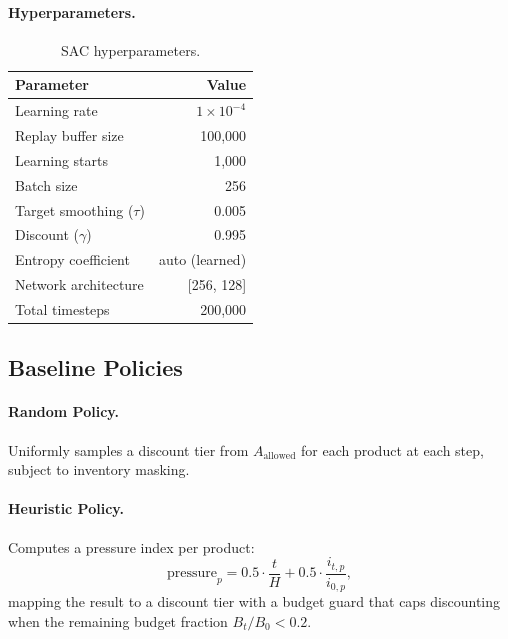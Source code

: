 \documentclass[11pt,a4paper]{article}
\begin{document}
\paragraph{Hyperparameters.}
\begin{table}[H]
\centering
\caption{SAC hyperparameters.}
\begin{tabular}{@{}lr@{}}
\toprule
\textbf{Parameter} & \textbf{Value} \\
\midrule
Learning rate & $1 \times 10^{-4}$ \\
Replay buffer size & 100,000 \\
Learning starts & 1,000 \\
Batch size & 256 \\
Target smoothing ($\tau$) & 0.005 \\
Discount ($\gamma$) & 0.995 \\
Entropy coefficient & auto (learned) \\
Network architecture & [256, 128] \\
Total timesteps & 200,000 \\
\bottomrule
\end{tabular}
\end{table}

\subsection{Baseline Policies}

\paragraph{Random Policy.} Uniformly samples a discount tier from $A_{\text{allowed}}$ for each product at each step, subject to inventory masking.

\paragraph{Heuristic Policy.} Computes a pressure index per product:
\begin{equation}
\text{pressure}_p = 0.5 \cdot \frac{t}{H} + 0.5 \cdot \frac{i_{t,p}}{i_{0,p}},
\end{equation}
mapping the result to a discount tier with a budget guard that caps discounting when the remaining budget fraction $B_t / B_0 < 0.2$.

\end{document}
